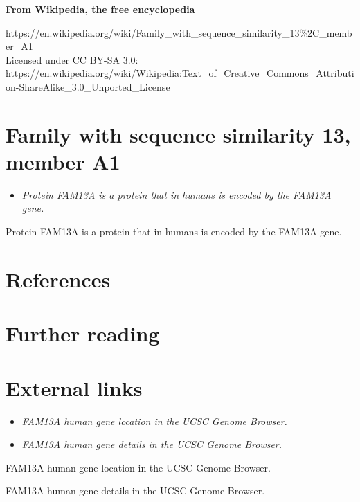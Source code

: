 \textbf{From Wikipedia, the free encyclopedia}

https://en.wikipedia.org/wiki/Family\_with\_sequence\_similarity\_13\%2C\_member\_A1\\
Licensed under CC BY-SA 3.0:\\
https://en.wikipedia.org/wiki/Wikipedia:Text\_of\_Creative\_Commons\_Attribution-ShareAlike\_3.0\_Unported\_License

\section{Family with sequence similarity 13, member
A1}\label{family-with-sequence-similarity-13-member-a1}

\begin{itemize}
\item
  \emph{Protein FAM13A is a protein that in humans is encoded by the
  FAM13A gene.}
\end{itemize}

Protein FAM13A is a protein that in humans is encoded by the FAM13A
gene.

\section{References}\label{references}

\section{Further reading}\label{further-reading}

\section{External links}\label{external-links}

\begin{itemize}
\item
  \emph{FAM13A human gene location in the UCSC Genome Browser.}
\item
  \emph{FAM13A human gene details in the UCSC Genome Browser.}
\end{itemize}

FAM13A human gene location in the UCSC Genome Browser.

FAM13A human gene details in the UCSC Genome Browser.
